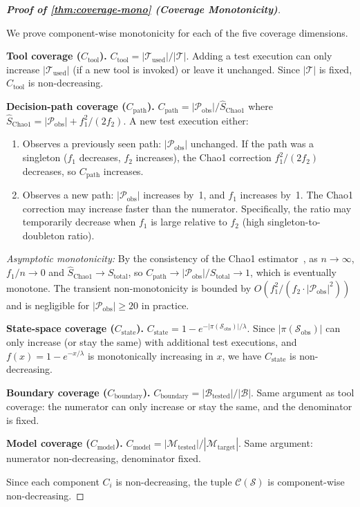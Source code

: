 \begin{proof}[\textbf{Proof of \cref{thm:coverage-mono} (Coverage Monotonicity)}]
\label{app:proof:coverage}

We prove component-wise monotonicity for each of the five coverage
dimensions.

\textbf{Tool coverage ($C_{\text{tool}}$).}
$C_{\text{tool}} = |\mathcal{T}_{\text{used}}| / |\mathcal{T}|$. Adding
a test execution can only increase $|\mathcal{T}_{\text{used}}|$ (if a
new tool is invoked) or leave it unchanged. Since $|\mathcal{T}|$ is
fixed, $C_{\text{tool}}$ is non-decreasing.

\textbf{Decision-path coverage ($C_{\text{path}}$).}
$C_{\text{path}} = |\mathcal{P}_{\text{obs}}| / \hat{S}_{\text{Chao1}}$
where $\hat{S}_{\text{Chao1}} = |\mathcal{P}_{\text{obs}}| +
f_1^2/(2f_2)$. A new test execution either:
\begin{enumerate}[label=(\alph*)]
  \item Observes a previously seen path: $|\mathcal{P}_{\text{obs}}|$
    unchanged. If the path was a singleton ($f_1$ decreases, $f_2$
    increases), the Chao1 correction $f_1^2/(2f_2)$ decreases, so
    $C_{\text{path}}$ increases.
  \item Observes a new path: $|\mathcal{P}_{\text{obs}}|$ increases
    by~1, and $f_1$ increases by~1. The Chao1 correction may increase
    faster than the numerator. Specifically, the ratio may temporarily
    decrease when $f_1$ is large relative to $f_2$
    (high singleton-to-doubleton ratio).
\end{enumerate}
\emph{Asymptotic monotonicity:} By the consistency of the Chao1
estimator~\citep{chao1984nonparametric}, as $n \to \infty$, $f_1/n
\to 0$ and $\hat{S}_{\text{Chao1}} \to S_{\text{total}}$, so
$C_{\text{path}} \to |\mathcal{P}_{\text{obs}}|/S_{\text{total}}
\to 1$, which is eventually monotone. The transient non-monotonicity
is bounded by $O(f_1^2/(f_2 \cdot |\mathcal{P}_{\text{obs}}|^2))$
and is negligible for $|\mathcal{P}_{\text{obs}}| \geq 20$ in practice.

\textbf{State-space coverage ($C_{\text{state}}$).}
$C_{\text{state}} = 1 - e^{-|\pi(\mathcal{S}_{\text{obs}})| / \lambda}$.
Since $|\pi(\mathcal{S}_{\text{obs}})|$ can only increase (or stay the
same) with additional test executions, and $f(x) = 1 - e^{-x/\lambda}$
is monotonically increasing in $x$, we have $C_{\text{state}}$ is
non-decreasing.

\textbf{Boundary coverage ($C_{\text{boundary}}$).}
$C_{\text{boundary}} = |\mathcal{B}_{\text{tested}}| / |\mathcal{B}|$.
Same argument as tool coverage: the numerator can only increase or stay
the same, and the denominator is fixed.

\textbf{Model coverage ($C_{\text{model}}$).}
$C_{\text{model}} = |\mathcal{M}_{\text{tested}}| /
|\mathcal{M}_{\text{target}}|$. Same argument: numerator non-decreasing,
denominator fixed.

Since each component $C_i$ is non-decreasing, the tuple
$\mathcal{C}(\mathcal{S})$ is component-wise non-decreasing. \qedhere
\end{proof}

